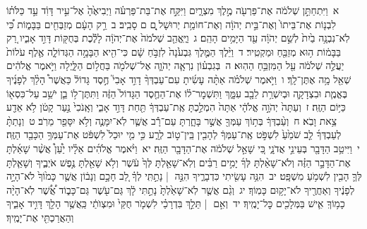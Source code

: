 \documentclass[18pt]{article}
\begin{document}
 {\loc א~}וַיִּתְחַתֵּ֣ן שְׁלֹמֹ֔ה אֶת־פַּרְעֹ֖ה מֶ֣לֶךְ מִצְרָ֑יִם וַיִּקַּ֣ח אֶת־בַּת־פַּרְעֹ֗ה וַיְבִיאֶ֙הָ֙ אֶל־עִ֣יר דָּוִ֔ד עַ֣ד כַּלֹּת֗וֹ לִבְנ֤וֹת אֶת־בֵּיתוֹ֙ וְאֶת־בֵּ֣ית יְהֹוָ֔ה וְאֶת־חוֹמַ֥ת יְרוּשָׁל ַ֖͏ְם ם סָבִֽיב׃ \startlock
 {\loc ב~}רַ֣ק הָעָ֔ם מְזַבְּחִ֖ים בַּבָּמ֑וֹת כִּ֠י לֹֽא־נִבְנָ֥ה בַ֙יִת֙ לְשֵׁ֣ם יְהֹוָ֔ה עַ֖ד הַיָּמִ֥ים הָהֵֽם׃ \startlock
 {\loc ג~}וַיֶּֽאֱהַ֤ב שְׁלֹמֹה֙ אֶת־יְהֹוָ֔ה לָלֶ֕כֶת בְּחֻקּ֖וֹת דָּוִ֣ד אָבִ֑יו רַ֚ק בַּבָּמ֔וֹת ה֥וּא מְזַבֵּ֖חַ וּמַקְטִֽיר׃ \startlock
 {\loc ד~}וַיֵּ֨לֶךְ הַמֶּ֤לֶךְ גִּבְעֹ֙נָה֙ לִזְבֹּ֣חַ שָׁ֔ם כִּי־הִ֖יא הַבָּמָ֣ה הַגְּדוֹלָ֑ה אֶ֤לֶף עֹלוֹת֙ יַעֲלֶ֣ה שְׁלֹמֹ֔ה עַ֖ל הַמִּזְבֵּ֥חַ הַהֽוּא׃ \startlock
 {\loc ה~}בְּגִבְע֗וֹן נִרְאָ֧ה יְהֹוָ֛ה אֶל־שְׁלֹמֹ֖ה בַּחֲל֣וֹם הַלָּ֑יְלָה וַיֹּ֣אמֶר אֱלֹהִ֔ים שְׁאַ֖ל מָ֥ה אֶתֶּן־לָֽךְ׃ \startlock
 {\loc ו~}וַיֹּ֣אמֶר שְׁלֹמֹ֗ה אַתָּ֨ה עָשִׂ֜יתָ עִם־עַבְדְּךָ֨ דָוִ֣ד אָבִי֮ חֶ֣סֶד גָּדוֹל֒ כַּאֲשֶׁר֩ הָלַ֨ךְ לְפָנֶ֜יךָ בֶּאֱמֶ֧ת וּבִצְדָקָ֛ה וּבְיִשְׁרַ֥ת לֵבָ֖ב עִמָּ֑ךְ וַתִּשְׁמׇר־ל֗וֹ אֶת־הַחֶ֤סֶד הַגָּדוֹל֙ הַזֶּ֔ה וַתִּתֶּן־ל֥וֹ בֵ֛ן יֹשֵׁ֥ב עַל־כִּסְא֖וֹ כַּיּ֥וֹם הַזֶּֽה׃ \startlock
 {\loc ז~}וְעַתָּה֙ יְהֹוָ֣ה אֱלֹהָ֔י אַתָּה֙ הִמְלַ֣כְתָּ אֶֽת־עַבְדְּךָ֔ תַּ֖חַת דָּוִ֣ד אָבִ֑י וְאָֽנֹכִי֙ נַ֣עַר קָטֹ֔ן לֹ֥א אֵדַ֖ע צֵ֥את וָבֹֽא׃ \startlock
 {\loc ח~}וְעַ֨בְדְּךָ֔ בְּת֥וֹךְ עַמְּךָ֖ אֲשֶׁ֣ר בָּחָ֑רְתָּ עַם־רָ֕ב אֲשֶׁ֧ר לֹֽא־יִמָּנֶ֛ה וְלֹ֥א יִסָּפֵ֖ר מֵרֹֽב׃ \startlock
 {\loc ט~}וְנָתַתָּ֨ לְעַבְדְּךָ֜ לֵ֤ב שֹׁמֵ֙עַ֙ לִשְׁפֹּ֣ט אֶֽת־עַמְּךָ֔ לְהָבִ֖ין בֵּֽין־ט֣וֹב לְרָ֑ע כִּ֣י מִ֤י יוּכַל֙ לִשְׁפֹּ֔ט אֶת־עַמְּךָ֥ הַכָּבֵ֖ד הַזֶּֽה׃ \startlock
 {\loc י~}וַיִּיטַ֥ב הַדָּבָ֖ר בְּעֵינֵ֣י אֲדֹנָ֑י כִּ֚י שָׁאַ֣ל שְׁלֹמֹ֔ה אֶת־הַדָּבָ֖ר הַזֶּֽה׃ \startlock
 {\loc יא~}וַיֹּ֨אמֶר אֱלֹהִ֜ים אֵלָ֗יו יַ֩עַן֩ אֲשֶׁ֨ר שָׁאַ֜לְתָּ אֶת־הַדָּבָ֣ר הַזֶּ֗ה וְלֹא־שָׁאַ֨לְתָּ לְּךָ֜ יָמִ֣ים רַבִּ֗ים וְלֹֽא־שָׁאַ֤לְתָּ לְּךָ֙ עֹ֔שֶׁר וְלֹ֥א שָׁאַ֖לְתָּ נֶ֣פֶשׁ אֹיְבֶ֑יךָ וְשָׁאַ֧לְתָּ לְּךָ֛ הָבִ֖ין לִשְׁמֹ֥עַ מִשְׁפָּֽט׃ \startlock
 {\loc יב~}הִנֵּ֥ה עָשִׂ֖יתִי כִּדְבָרֶ֑יךָ הִנֵּ֣ה  |  נָתַ֣תִּֽי לְךָ֗ לֵ֚ב חָכָ֣ם וְנָב֔וֹן אֲשֶׁ֤ר כָּמ֙וֹךָ֙ לֹא־הָיָ֣ה לְפָנֶ֔יךָ וְאַחֲרֶ֖יךָ לֹא־יָק֥וּם כָּמֽוֹךָ׃ \startlock
 {\loc יג~}וְגַ֨ם אֲשֶׁ֤ר לֹֽא־שָׁאַ֙לְתָּ֙ נָתַ֣תִּי לָ֔ךְ גַּם־עֹ֖שֶׁר גַּם־כָּב֑וֹד אֲ֠שֶׁ֠ר לֹֽא־הָיָ֨ה כָמ֥וֹךָֽ אִ֛ישׁ בַּמְּלָכִ֖ים כׇּל־יָמֶֽיךָ׃ \startlock
 {\loc יד~}וְאִ֣ם  |  תֵּלֵ֣ךְ בִּדְרָכַ֗י לִשְׁמֹ֤ר חֻקַּי֙ וּמִצְוֺתַ֔י כַּֽאֲשֶׁ֥ר הָלַ֖ךְ דָּוִ֣יד אָבִ֑יךָ וְהַאֲרַכְתִּ֖י אֶת־יָמֶֽיךָ׃ \startlock
\end{document}
